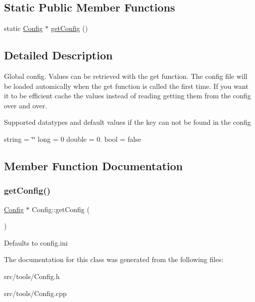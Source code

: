 \subsection*{Static Public Member Functions}
\begin{DoxyCompactItemize}
\item 
static \hyperlink{classConfig}{Config} $\ast$ \hyperlink{classConfig_a8b276bc712a71bc2febd789071974c44}{get\+Config} ()
\end{DoxyCompactItemize}


\subsection{Detailed Description}
Global config. Values can be retrieved with the get function. The config file will be loaded automically when the get function is called the first time. If you want it to be efficient cache the values instead of reading getting them from the config over and over. 

Supported datatypes and default values if the key can not be found in the config

string = \char`\"{}\char`\"{} long = 0 double = 0. bool = false 

\subsection{Member Function Documentation}
\mbox{\label{classConfig_a8b276bc712a71bc2febd789071974c44}} 
\subsubsection{\texorpdfstring{get\+Config()}{getConfig()}}
{\footnotesize\ttfamily \hyperlink{classConfig}{Config} $\ast$ Config\+::get\+Config (\begin{DoxyParamCaption}{ }\end{DoxyParamCaption})\hspace{0.3cm}{\ttfamily [static]}}

Defaults to config.\+ini 

The documentation for this class was generated from the following files\+:\begin{DoxyCompactItemize}
\item 
src/tools/Config.\+h\item 
src/tools/Config.\+cpp\end{DoxyCompactItemize}
